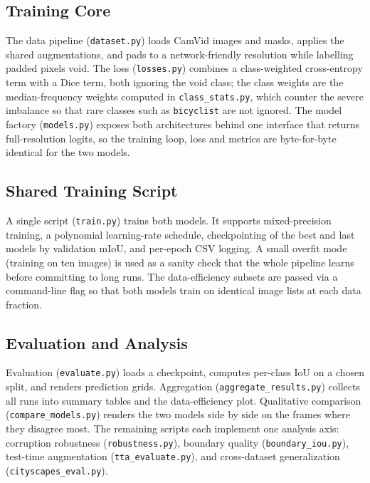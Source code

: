 \documentclass[11pt,a4paper]{article}
\begin{document}
\subsection{Training Core}

The data pipeline (\texttt{dataset.py}) loads CamVid images and masks, applies
the shared augmentations, and pads to a network-friendly resolution while
labelling padded pixels void. The loss (\texttt{losses.py}) combines a
class-weighted cross-entropy term with a Dice term, both ignoring the void
class; the class weights are the median-frequency weights computed in
\texttt{class\_stats.py}, which counter the severe imbalance so that rare
classes such as \texttt{bicyclist} are not ignored. The model factory
(\texttt{models.py}) exposes both architectures behind one interface that
returns full-resolution logits, so the training loop, loss and metrics are
byte-for-byte identical for the two models.

\subsection{Shared Training Script}

A single script (\texttt{train.py}) trains both models. It supports
mixed-precision training, a polynomial learning-rate schedule, checkpointing of
the best and last models by validation mIoU, and per-epoch CSV logging. A small
overfit mode (training on ten images) is used as a sanity check that the whole
pipeline learns before committing to long runs. The data-efficiency subsets are
passed via a command-line flag so that both models train on identical image
lists at each data fraction.

\subsection{Evaluation and Analysis}

Evaluation (\texttt{evaluate.py}) loads a checkpoint, computes per-class IoU on
a chosen split, and renders prediction grids. Aggregation
(\texttt{aggregate\_results.py}) collects all runs into summary tables and the
data-efficiency plot. Qualitative comparison (\texttt{compare\_models.py})
renders the two models side by side on the frames where they disagree most.
The remaining scripts each implement one analysis axis: corruption robustness
(\texttt{robustness.py}), boundary quality (\texttt{boundary\_iou.py}),
test-time augmentation (\texttt{tta\_evaluate.py}), and cross-dataset
generalization (\texttt{cityscapes\_eval.py}).
\end{document}
